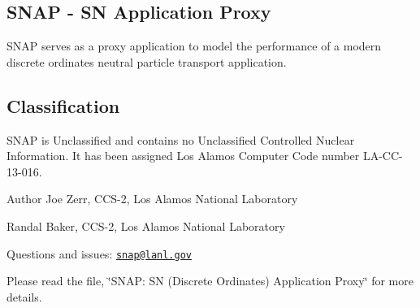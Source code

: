 \subsection*{S\-N\-A\-P -\/ S\-N Application Proxy}

S\-N\-A\-P serves as a proxy application to model the performance of a modern discrete ordinates neutral particle transport application.

\subsection*{Classification}

S\-N\-A\-P is Unclassified and contains no Unclassified Controlled Nuclear Information. It has been assigned Los Alamos Computer Code number L\-A-\/\-C\-C-\/13-\/016.

\begin{DoxyAuthor}{Author}
Joe Zerr, C\-C\-S-\/2, Los Alamos National Laboratory 

Randal Baker, C\-C\-S-\/2, Los Alamos National Laboratory
\end{DoxyAuthor}
Questions and issues\-: \href{mailto:snap@lanl.gov}{\tt snap@lanl.\-gov}

Please read the file, \char`\"{}\-S\-N\-A\-P\-: S\-N (\-Discrete Ordinates) Application Proxy\char`\"{} for more details. 
